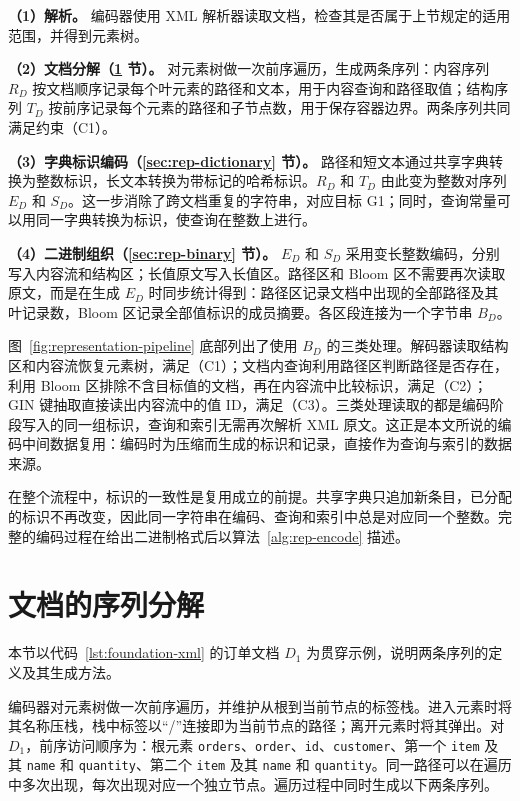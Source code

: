 \textbf{（1）解析。} 编码器使用 XML 解析器读取文档，检查其是否属于上节规定的适用范围，并得到元素树。

\textbf{（2）文档分解（\ref{sec:rep-decompose} 节）。} 对元素树做一次前序遍历，生成两条序列：内容序列 $R_D$ 按文档顺序记录每个叶元素的路径和文本，用于内容查询和路径取值；结构序列 $T_D$ 按前序记录每个元素的路径和子节点数，用于保存容器边界。两条序列共同满足约束（C1）。

\textbf{（3）字典标识编码（\ref{sec:rep-dictionary} 节）。} 路径和短文本通过共享字典转换为整数标识，长文本转换为带标记的哈希标识。$R_D$ 和 $T_D$ 由此变为整数对序列 $E_D$ 和 $S_D$。这一步消除了跨文档重复的字符串，对应目标 G1；同时，查询常量可以用同一字典转换为标识，使查询在整数上进行。

\textbf{（4）二进制组织（\ref{sec:rep-binary} 节）。} $E_D$ 和 $S_D$ 采用变长整数编码，分别写入内容流和结构区；长值原文写入长值区。路径区和 Bloom 区不需要再次读取原文，而是在生成 $E_D$ 时同步统计得到：路径区记录文档中出现的全部路径及其叶记录数，Bloom 区记录全部值标识的成员摘要。各区段连接为一个字节串 $B_D$。

图~\ref{fig:representation-pipeline} 底部列出了使用 $B_D$ 的三类处理。解码器读取结构区和内容流恢复元素树，满足（C1）；文档内查询利用路径区判断路径是否存在，利用 Bloom 区排除不含目标值的文档，再在内容流中比较标识，满足（C2）；GIN 键抽取直接读出内容流中的值 ID，满足（C3）。三类处理读取的都是编码阶段写入的同一组标识，查询和索引无需再次解析 XML 原文。这正是本文所说的编码中间数据复用：编码时为压缩而生成的标识和记录，直接作为查询与索引的数据来源。

在整个流程中，标识的一致性是复用成立的前提。共享字典只追加新条目，已分配的标识不再改变，因此同一字符串在编码、查询和索引中总是对应同一个整数。完整的编码过程在给出二进制格式后以算法~\ref{alg:rep-encode} 描述。

\section{文档的序列分解}
\label{sec:rep-decompose}

本节以代码~\ref{lst:foundation-xml} 的订单文档 $D_1$ 为贯穿示例，说明两条序列的定义及其生成方法。

编码器对元素树做一次前序遍历，并维护从根到当前节点的标签栈。进入元素时将其名称压栈，栈中标签以“/”连接即为当前节点的路径；离开元素时将其弹出。对 $D_1$，前序访问顺序为：根元素 \texttt{orders}、\texttt{order}、\texttt{id}、\texttt{customer}、第一个 \texttt{item} 及其 \texttt{name} 和 \texttt{quantity}、第二个 \texttt{item} 及其 \texttt{name} 和 \texttt{quantity}。同一路径可以在遍历中多次出现，每次出现对应一个独立节点。遍历过程中同时生成以下两条序列。

